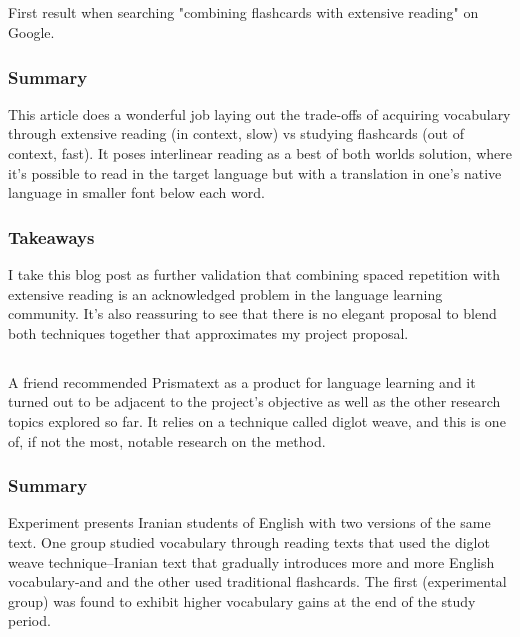 \documentclass[
	letterpaper, %
]{jdf}
\begin{document}
\subsection{}
First result when searching "combining flashcards with extensive reading" on Google.

\subsubsection{Summary}
This article does a wonderful job laying out the trade-offs of acquiring vocabulary through extensive reading (in context, slow) vs studying flashcards (out of context, fast). It poses interlinear reading as a best of both worlds solution, where it's possible to read in the target language but with a translation in one's native language in smaller font below each word.

\subsubsection{Takeaways}
I take this blog post as further validation that combining spaced repetition with extensive reading is an acknowledged problem in the language learning community. It's also reassuring to see that there is no elegant proposal to blend both techniques together that approximates my project proposal.

\subsection{}
A friend recommended Prismatext as a product for language learning and it turned out to be adjacent to the project's objective as well as the other research topics explored so far. It relies on a technique called diglot weave, and this is one of, if not the most, notable research on the method.

\subsubsection{Summary}
Experiment presents Iranian students of English with two versions of the same text. One group studied vocabulary through reading texts that used the diglot weave technique–Iranian text that gradually introduces more and more English vocabulary-and and the other used traditional flashcards. The first (experimental group) was found to exhibit higher vocabulary gains at the end of the study period.
\end{document}
